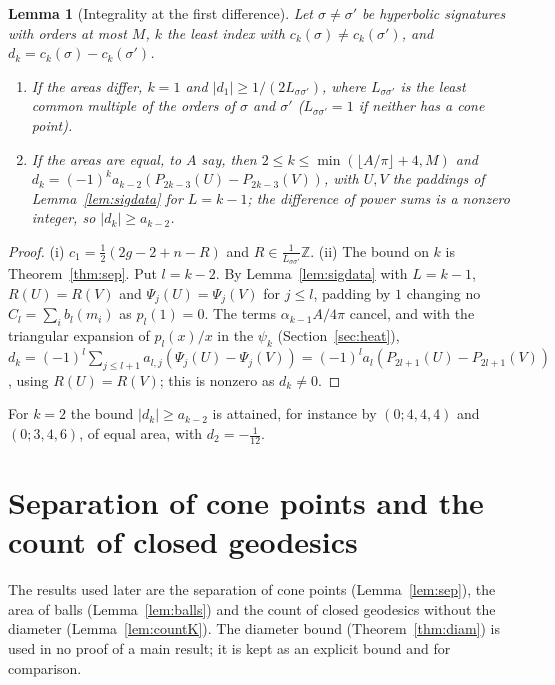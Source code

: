 \documentclass[pdflatex,sn-mathphys-num]{sn-jnl}
\theoremstyle{thmstyleone}%
\newtheorem{lemma}[theorem]{Lemma}%
\theoremstyle{thmstylethree}%
\newcommand{\Z}{\mathbb{Z}}
\begin{document}
\begin{lemma}[Integrality at the first difference]\label{lem:int}
Let $\sigma\ne\sigma'$ be hyperbolic signatures with orders at most $M$, $k$ the least index with $c_k(\sigma)\ne c_k(\sigma')$, and $d_k=c_k(\sigma)-c_k(\sigma')$.
\begin{enumerate}[label=(\roman*)]
\item If the areas differ, $k=1$ and $|d_1|\ge1/(2L_{\sigma\sigma'})$, where $L_{\sigma\sigma'}$ is the least common multiple of the orders of $\sigma$ and $\sigma'$ ($L_{\sigma\sigma'}=1$ if neither has a cone point).
\item If the areas are equal, to $A$ say, then $2\le k\le\min(\lfloor A/\pi\rfloor+4,M)$ and $d_k=(-1)^ka_{k-2}(P_{2k-3}(U)-P_{2k-3}(V))$, with $U,V$ the paddings of Lemma~\ref{lem:sigdata} for $L=k-1$; the difference of power sums is a nonzero integer, so $|d_k|\ge a_{k-2}$.
\end{enumerate}
\end{lemma}

\begin{proof}
(i) $c_1=\frac12(2g-2+n-R)$ and $R\in\frac1{L_{\sigma\sigma'}}\Z$. (ii) The bound on $k$ is Theorem~\ref{thm:sep}. Put $l=k-2$. By Lemma~\ref{lem:sigdata} with $L=k-1$, $R(U)=R(V)$ and $\Psi_j(U)=\Psi_j(V)$ for $j\le l$, padding by $1$ changing no $C_l=\sum_ib_l(m_i)$ as $p_l(1)=0$. The terms $\alpha_{k-1}A/4\pi$ cancel, and with the triangular expansion of $p_l(x)/x$ in the $\psi_k$ (Section~\ref{sec:heat}), $d_k=(-1)^l\sum_{j\le l+1}a_{l,j}(\Psi_j(U)-\Psi_j(V))=(-1)^la_l(P_{2l+1}(U)-P_{2l+1}(V))$, using $R(U)=R(V)$; this is nonzero as $d_k\ne0$.
\end{proof}

For $k=2$ the bound $|d_k|\ge a_{k-2}$ is attained, for instance by $(0;4,4,4)$ and $(0;3,4,6)$, of equal area, with $d_2=-\frac1{12}$.

\section{Separation of cone points and the count of closed geodesics}\label{sec:geom}

The results used later are the separation of cone points (Lemma~\ref{lem:sep}), the area of balls (Lemma~\ref{lem:balls}) and the count of closed geodesics without the diameter (Lemma~\ref{lem:countK}). The diameter bound (Theorem~\ref{thm:diam}) is used in no proof of a main result; it is kept as an explicit bound and for comparison.
\end{document}
